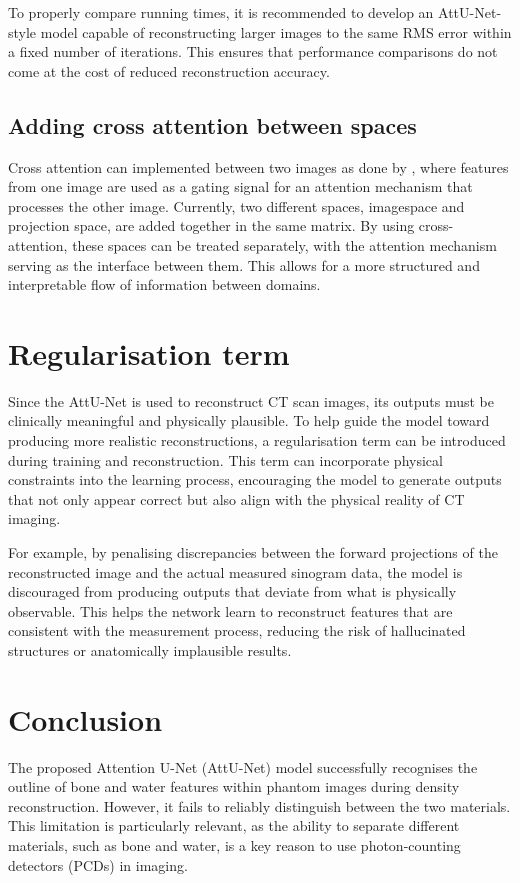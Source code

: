 \documentclass{article}
\begin{document}
To properly compare running times, it is recommended to develop an AttU-Net-style model capable of reconstructing larger images to the same RMS error within a fixed number of iterations. This ensures that performance comparisons do not come at the cost of reduced reconstruction accuracy.

\subsection{Adding cross attention between spaces}

Cross attention can implemented between two images as done by \citep{alaluf2023cross}, where features from one image are used as a gating signal for an attention mechanism that processes the other image. Currently, two different spaces, imagespace and projection space, are added together in the same matrix. By using cross-attention, these spaces can be treated separately, with the attention mechanism serving as the interface between them. This allows for a more structured and interpretable flow of information between domains.

\section{Regularisation term}

Since the AttU-Net is used to reconstruct CT scan images, its outputs must be clinically meaningful and physically plausible. To help guide the model toward producing more realistic reconstructions, a regularisation term can be introduced during training and reconstruction. This term can incorporate physical constraints into the learning process, encouraging the model to generate outputs that not only appear correct but also align with the physical reality of CT imaging.

For example, by penalising discrepancies between the forward projections of the reconstructed image and the actual measured sinogram data, the model is discouraged from producing outputs that deviate from what is physically observable. This helps the network learn to reconstruct features that are consistent with the measurement process, reducing the risk of hallucinated structures or anatomically implausible results.

\section{Conclusion}

The proposed Attention U-Net (AttU-Net) model successfully recognises the outline of bone and water features within phantom images during density reconstruction. However, it fails to reliably distinguish between the two materials. This limitation is particularly relevant, as the ability to separate different materials, such as bone and water, is a key reason to use photon-counting detectors (PCDs) in imaging.
\end{document}
